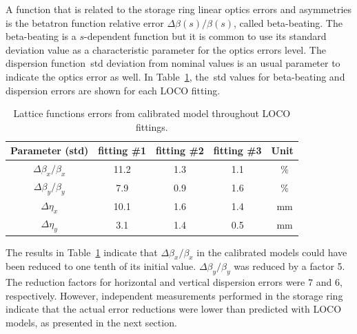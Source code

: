 A function that is related to the storage ring linear optics errors and asymmetries is the betatron function relative error $\Delta \beta(s)/\beta(s)$, called beta-beating. The beta-beating is a $s$-dependent function but it is common to use its standard deviation value as a characteristic parameter for the optics errors level. The dispersion function~\gls{std} deviation from nominal values is an usual parameter to indicate the optics error as well. In Table~\ref{tab:calibrated_optics}, the~\gls{std} values for beta-beating and dispersion errors are shown for each LOCO fitting.
\begin{table}
    \centering
    \caption{Lattice functions errors from calibrated model throughout LOCO fittings.}
    \label{tab:calibrated_optics}
    \begin{tabular}{ccccc}
        \toprule\toprule
        Parameter (std) & fitting \#1 & fitting \#2 & fitting \#3 & Unit \\
        \hline
        $\Delta\beta_x/\beta_x$ & \num{11.2} & \num{1.3} & \num{1.1} &\SI{}{\%}  \\
        $\Delta\beta_y/\beta_y$ & \num{7.9} & \num{0.9} & \num{1.6} &\SI{}{\%} \\
        $\Delta\eta_x$ &  \num{10.1} &  \num{1.6} & \num{1.4} & \SI{}{\milli\meter}  \\
        $\Delta\eta_y$ &  \num{3.1} &  \num{1.4} & \num{0.5} & \SI{}{\milli\meter} \\
        \bottomrule\bottomrule
    \end{tabular}
\end{table}

The results in Table~\ref{tab:calibrated_optics} indicate that $\Delta\beta_x/\beta_x$ in the calibrated models could have been reduced to one tenth of its initial value. $\Delta\beta_y/\beta_y$ was reduced by a factor 5. The reduction factors for horizontal and vertical dispersion errors were $7$ and $6$, respectively. However, independent measurements performed in the storage ring indicate that the actual error reductions were lower than predicted with LOCO models, as presented in the next section. 

